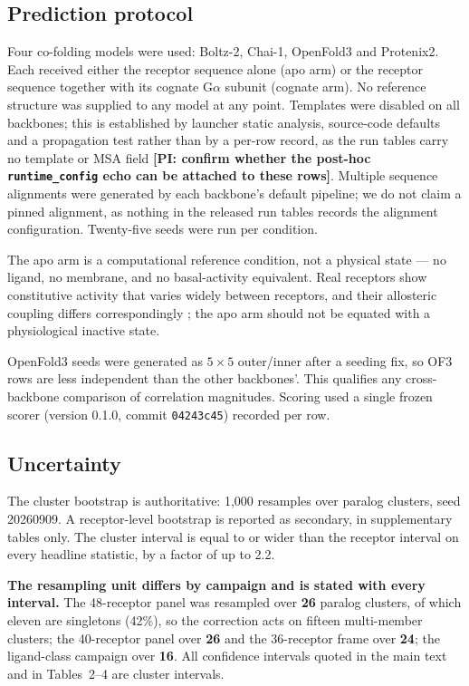 \subsection*{Prediction protocol}

Four co-folding models were used: Boltz-2, Chai-1, OpenFold3 and Protenix2. Each
received either the receptor sequence alone (apo arm) or the receptor sequence
together with its cognate G$\alpha$ subunit (cognate arm). No reference structure was supplied to any model at any point.
Templates were disabled on all backbones; this is established by launcher static
analysis, source-code defaults and a propagation test rather than by a per-row
record, as the run tables carry no template or MSA field \textbf{[PI: confirm
whether the post-hoc \texttt{runtime\_config} echo can be attached to these
rows]}. Multiple sequence alignments were generated by each backbone's default
pipeline; we do not claim a pinned alignment, as nothing in the released run
tables records the alignment configuration. Twenty-five seeds
were run per condition.

The apo arm is a computational reference condition, not a physical state --- no
ligand, no membrane, and no basal-activity equivalent. Real receptors show
constitutive activity that varies widely between receptors, and their allosteric
coupling differs correspondingly \citep{georgiou2025heterogeneity}; the apo arm
should not be equated with a physiological inactive state.

OpenFold3 seeds were generated as $5 \times 5$ outer/inner after a seeding fix,
so OF3 rows are less independent than the other backbones'. This qualifies any
cross-backbone comparison of correlation magnitudes. Scoring used a single
frozen scorer (version 0.1.0, commit \texttt{04243c45}) recorded per row.

\subsection*{Uncertainty}

The cluster bootstrap is authoritative: 1{,}000 resamples over paralog clusters,
seed 20260909. A receptor-level bootstrap is reported as secondary, in
supplementary tables only. The cluster interval is equal to or wider than the
receptor interval on every headline statistic, by a factor of up to 2.2.

\textbf{The resampling unit differs by campaign and is stated with every
interval.} The 48-receptor panel was resampled over \textbf{26} paralog
clusters, of which eleven are singletons (42\%), so the correction acts on
fifteen multi-member clusters; the 40-receptor panel over \textbf{26} and the
36-receptor frame over \textbf{24}; the ligand-class campaign over \textbf{16}.
All confidence intervals quoted in the main text and in Tables~2--4 are cluster
intervals.

